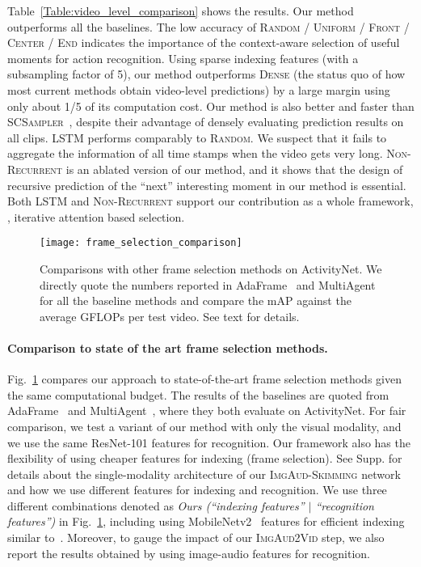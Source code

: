 Table~\ref{Table:video_level_comparison} shows the results. Our method outperforms all the baselines. The low accuracy of \textsc{Random} / \textsc{Uniform} / \textsc{Front} / \textsc{Center} / \textsc{End} indicates the importance of the context-aware selection of useful moments for action recognition. Using sparse indexing features (with a subsampling factor of 5), our method outperforms \textsc{Dense} (the status quo of how most current methods obtain video-level predictions) by a large margin using only about 1/5 of its computation cost. Our method is also better and faster than \textsc{SCSampler}~\cite{korbar2019scsampler}, despite their advantage of densely evaluating prediction results on all clips. \textsc{LSTM} performs comparably to \textsc{Random}. We suspect that it fails to aggregate the information of all time stamps when the video gets very long. \textsc{Non-Recurrent} is an ablated version of our method, and it shows that the design of recursive prediction of the ``next'' interesting moment in our method is essential. Both \textsc{LSTM} and \textsc{Non-Recurrent} support our contribution as a whole framework, \ie, iterative attention based selection.

\begin{figure}
    \center
    \texttt{[image: frame\_selection\_comparison]}
    \caption{Comparisons with other frame selection methods on ActivityNet. We directly quote the numbers reported in AdaFrame~\cite{wu2019adaframe} and MultiAgent~\cite{wu2019multiagent} for all the baseline methods and compare the mAP against the average GFLOPs per test video. See text for details.
      \vspace{-0.15in}}
    \label{Figure:frame_selection}
    \vspace{-0.1in}
\end{figure}

\vspace{-0.05in}
\paragraph{Comparison to state of the art frame selection methods.} Fig.~\ref{Figure:frame_selection} compares our approach to state-of-the-art frame selection methods given the same computational budget. The results of the baselines are quoted from AdaFrame~\cite{wu2019adaframe} and MultiAgent~\cite{wu2019multiagent}, where they both evaluate on ActivityNet. For fair comparison, we test a variant of our method with only the visual modality, and we use the same ResNet-101 features for recognition. Our framework also has the flexibility of using cheaper features for indexing (frame selection). See Supp. for details about the single-modality architecture of our \textsc{ImgAud-Skimming} network and how we use different features for indexing and recognition. We use three different combinations denoted as {\em Ours (``indexing features'' $\vert$ ``recognition features'')} in Fig.~\ref{Figure:frame_selection}, including using MobileNetv2~\cite{sandler2018mobilenetv2} features for efficient indexing similar to~\cite{wu2019adaframe}. Moreover, to gauge the impact of our \textsc{ImgAud2Vid} step, we also report the results obtained by using image-audio features for recognition.

